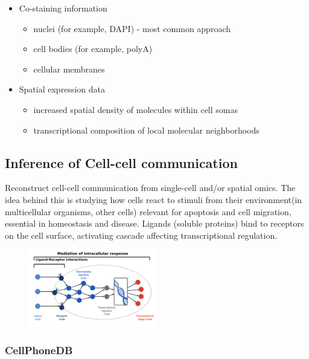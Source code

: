 \begin{itemize}
\tightlist
\item
  Co-staining information

  \begin{itemize}
  \tightlist
  \item
    nuclei (for example, DAPI) - most common approach
  \item
    cell bodies (for example, polyA)
  \item
    cellular membranes
  \end{itemize}
\item
  Spatial expression data

  \begin{itemize}
  \tightlist
  \item
    increased spatial density of molecules within cell somas
  \item
    transcriptional composition of local molecular neighborhoods
  \end{itemize}
\end{itemize}

\hypertarget{inference-of-cell-cell-communication}{%
\subsection{Inference of Cell-cell
communication}\label{inference-of-cell-cell-communication}}

Reconstruct cell-cell communication from single-cell and/or spatial
omics. The idea behind this is studying how cells react to stimuli from
their environment(in multicellular organisms, other cells) relevant for
apoptosis and cell migration, essential in homeostasis and disease.
Ligands (soluble proteins) bind to receptors on the cell surface,
activating cascade affecting transcriptional regulation.

\begin{figure}
\centering
\includegraphics[width=0.5\textwidth]{images/Screenshot_10.png}
\caption{}
\end{figure}

\hypertarget{cellphonedb}{%
\subsubsection{CellPhoneDB}\label{cellphonedb}}

